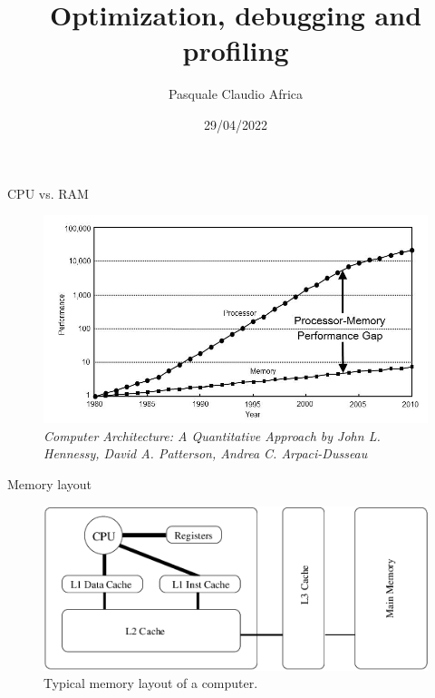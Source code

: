 \documentclass[10pt]{beamer}
\begin{document}
    \title{Optimization, debugging and profiling}
    \author{Pasquale Claudio Africa}
    \date{29/04/2022}

\begin{frame}
    \maketitle
\end{frame}

\begin{frame}{CPU vs. RAM}
    \begin{figure}
        \centering
        \includegraphics[width=\textwidth]{images/cpu_memory_performance_gap.png}
        \caption{\textit{Computer Architecture: A Quantitative Approach by John L. Hennessy, David A. Patterson, Andrea C. Arpaci-Dusseau}}
    \end{figure}
\end{frame}

\begin{frame}{Memory layout}
    \begin{figure}
        \centering
        \includegraphics[width=\textwidth]{images/memory_layout.png}
        \caption{Typical memory layout of a computer.}
    \end{figure}
\end{frame}
\end{document}
